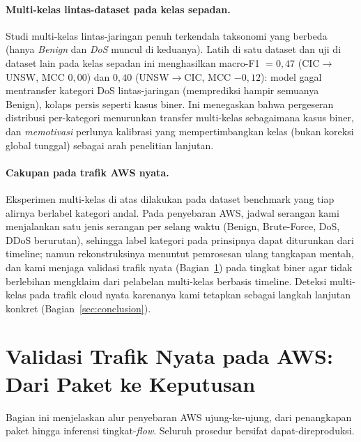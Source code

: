 \documentclass[11pt,a4paper]{article}
\begin{document}
\paragraph{Multi-kelas lintas-dataset pada kelas sepadan.} Studi multi-kelas
lintas-jaringan penuh terkendala taksonomi yang berbeda (hanya \emph{Benign} dan
\emph{DoS} muncul di keduanya). Latih di satu dataset dan uji di dataset lain pada
kelas sepadan ini menghasilkan macro-F1 $=0{,}47$ (CIC$\rightarrow$UNSW, MCC
$0{,}00$) dan $0{,}40$ (UNSW$\rightarrow$CIC, MCC $-0{,}12$): model gagal
mentransfer kategori DoS lintas-jaringan (memprediksi hampir semuanya Benign),
kolaps persis seperti kasus biner. Ini menegaskan bahwa pergeseran distribusi
per-kategori menurunkan transfer multi-kelas sebagaimana kasus biner, dan
\emph{memotivasi} perlunya kalibrasi yang mempertimbangkan kelas (bukan koreksi
global tunggal) sebagai arah penelitian lanjutan.

\paragraph{Cakupan pada trafik AWS nyata.} Eksperimen multi-kelas di atas dilakukan
pada dataset benchmark yang tiap alirnya berlabel kategori andal. Pada penyebaran
AWS, jadwal serangan kami menjalankan satu jenis serangan per selang waktu (Benign,
Brute-Force, DoS, DDoS berurutan), sehingga label kategori pada prinsipnya dapat
diturunkan dari timeline; namun rekonstruksinya menuntut pemrosesan ulang tangkapan
mentah, dan kami menjaga validasi trafik nyata (Bagian~\ref{sec:realtraffic}) pada
tingkat biner agar tidak berlebihan mengklaim dari pelabelan multi-kelas berbasis
timeline. Deteksi multi-kelas pada trafik cloud nyata karenanya kami tetapkan
sebagai langkah lanjutan konkret (Bagian~\ref{sec:conclusion}).

\section{Validasi Trafik Nyata pada AWS: Dari Paket ke Keputusan}
\label{sec:realtraffic}

\noindent Bagian ini menjelaskan alur penyebaran AWS ujung-ke-ujung, dari penangkapan
paket hingga inferensi tingkat-\emph{flow}. Seluruh prosedur bersifat dapat-direproduksi.
\end{document}
